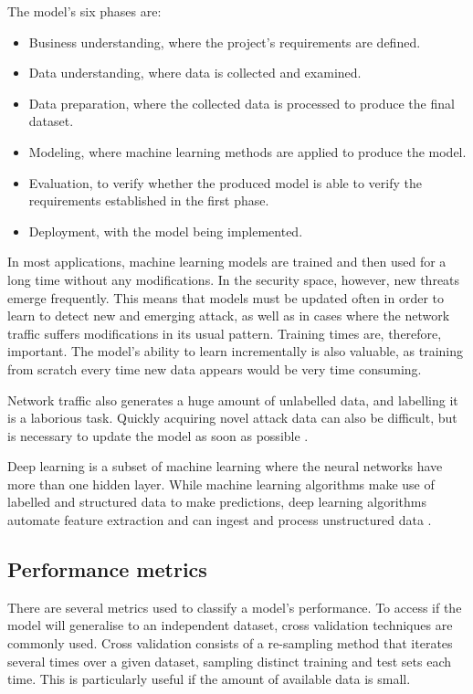 The model's six phases are:
\begin{itemize}
    \item Business understanding, where the project's requirements are defined.
    \item Data understanding, where data is collected and examined.
    \item Data preparation, where the collected data is processed to produce the final dataset.
    \item Modeling, where machine learning methods are applied to produce the model.
    \item Evaluation, to verify whether the produced model is able to verify the requirements established in the first phase.
    \item Deployment, with the model being implemented.
\end{itemize}

In most applications, machine learning models are trained and then used for a long time without any modifications. In the security space, however, new threats emerge frequently. This means that models must be updated often in order to learn to detect new and emerging attack, as well as in cases where the network traffic suffers modifications in its usual pattern. Training times are, therefore, important. The model's ability to learn incrementally is also valuable, as training from scratch every time new data appears would be very time consuming.\par

Network traffic also generates a huge amount of unlabelled data, and labelling it is a laborious task. Quickly acquiring novel attack data can also be difficult, but is necessary to update the model as soon as possible \citep{Buczak2016}.\par

Deep learning is a subset of machine learning where the neural networks have more than one hidden layer. While machine learning algorithms make use of labelled and structured data to make predictions, deep learning algorithms automate feature extraction and can ingest and process unstructured data \citep{ibmDeepLearning}.

\subsection{Performance metrics}

There are several metrics used to classify a model's performance. To access if the model will generalise to an independent dataset, cross validation techniques are commonly used. Cross validation consists of a re-sampling method that iterates several times over a given dataset, sampling distinct training and test sets each time. This is particularly useful if the amount of available data is small.\par

